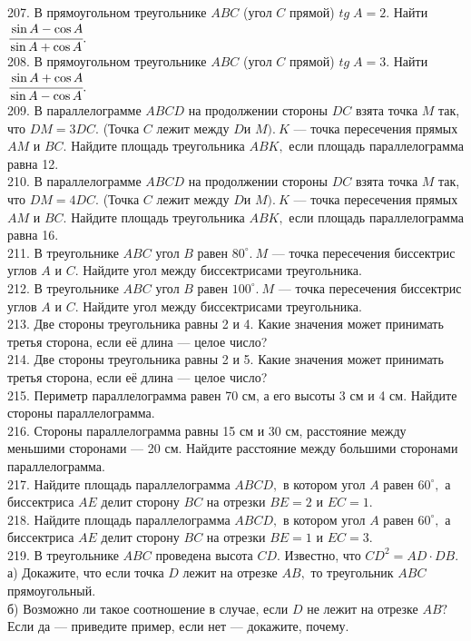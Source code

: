 207. В прямоугольном треугольнике $ABC$ (угол $C$ прямой) $tg\; A=2.$ Найти $\cfrac{\sin A -\cos A}{\sin A +\cos A}.$\\
208. В прямоугольном треугольнике $ABC$ (угол $C$ прямой) $tg\; A=3.$ Найти $\cfrac{\sin A +\cos A}{\sin A - \cos A}.$\\
209. В параллелограмме $ABCD$ на продолжении стороны $DC$ взята точка $M$ так, что $DM=3DC.$ (Точка $C$
лежит между $D$и $M).\ K$ --- точка пересечения прямых $AM$ и $BC.$ Найдите площадь треугольника $ABK,$ если
площадь параллелограмма равна 12.\\
210. В параллелограмме $ABCD$ на продолжении стороны $DC$ взята точка $M$ так, что $DM=4DC.$ (Точка $C$
лежит между $D$и $M).\ K$ --- точка пересечения прямых $AM$ и $BC.$ Найдите площадь треугольника $ABK,$ если
площадь параллелограмма равна 16.\\
211. В треугольнике $ABC$ угол $B$ равен $80^\circ.\ M$ --- точка пересечения биссектрис углов $A$ и $C.$
Найдите угол между биссектрисами треугольника.\\
212. В треугольнике $ABC$ угол $B$ равен $100^\circ.\ M$ --- точка пересечения биссектрис углов $A$ и $C.$
Найдите угол между биссектрисами треугольника.\\
213. Две стороны треугольника равны 2 и 4. Какие значения может принимать третья сторона, если её длина --- целое число?\\
214. Две стороны треугольника равны 2 и 5. Какие значения может принимать третья сторона, если её длина --- целое число?\\
215. Периметр параллелограмма равен 70 см, а его высоты 3 см и 4 см. Найдите стороны параллелограмма.\\
216. Стороны параллелограмма равны 15 см и 30 см, расстояние между меньшими сторонами --- 20 см. Найдите расстояние между большими сторонами параллелограмма.\\
217. Найдите площадь параллелограмма $ABCD,$ в котором угол $A$ равен $60^\circ,$ а биссектриса $AE$ делит сторону $BC$ на отрезки $BE=2$ и $EC=1.$\\
218. Найдите площадь параллелограмма $ABCD,$ в котором угол $A$ равен $60^\circ,$ а биссектриса $AE$ делит сторону $BC$ на отрезки $BE=1$ и $EC=3.$\\
219. В треугольнике $ABC$ проведена высота $CD.$ Известно, что $CD^2=AD\cdot DB.$\\
а) Докажите, что если точка $D$ лежит на отрезке $AB,$ то треугольник $ABC$ прямоугольный.\\
б) Возможно ли такое соотношение в случае, если $D$ не лежит на отрезке $AB?$ Если да --- приведите пример, если нет --- докажите, почему.\\
